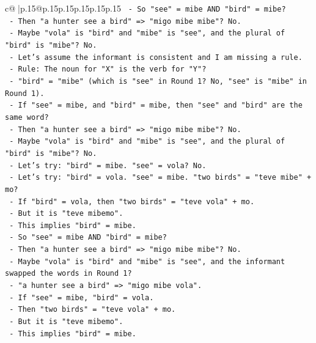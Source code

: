 \documentclass{article}
\begin{document}
{\begin{supertabular}{c@{$\;$}|p{.15\linewidth}@{}p{.15\linewidth}p{.15\linewidth}p{.15\linewidth}p{.15\linewidth}p{.15\linewidth}}
{{{\texttt{          {-} So "see" = mibe AND "bird" = mibe?} \\
\texttt{          {-} Then "a hunter see a bird" => "migo mibe mibe"? No.} \\
\texttt{          {-} Maybe "vola" is "bird" and "mibe" is "see", and the plural of "bird" is "mibe"? No.} \\
\texttt{          {-} Let's assume the informant is consistent and I am missing a rule.} \\
\texttt{          {-} Rule: The noun for "X" is the verb for "Y"?} \\
\texttt{            {-} "bird" = "mibe" (which is "see" in Round 1? No, "see" is "mibe" in Round 1).} \\
\texttt{            {-} If "see" = mibe, and "bird" = mibe, then "see" and "bird" are the same word?} \\
\texttt{            {-} Then "a hunter see a bird" => "migo mibe mibe"? No.} \\
\texttt{            {-} Maybe "vola" is "bird" and "mibe" is "see", and the plural of "bird" is "mibe"? No.} \\
\texttt{            {-} Let's try: "bird" = mibe. "see" = vola? No.} \\
\texttt{            {-} Let's try: "bird" = vola. "see" = mibe. "two birds" = "teve mibe" + mo?} \\
\texttt{            {-} If "bird" = vola, then "two birds" = "teve vola" + mo.} \\
\texttt{            {-} But it is "teve mibemo".} \\
\texttt{            {-} This implies "bird" = mibe.} \\
\texttt{            {-} So "see" = mibe AND "bird" = mibe?} \\
\texttt{            {-} Then "a hunter see a bird" => "migo mibe mibe"? No.} \\
\texttt{            {-} Maybe "vola" is "bird" and "mibe" is "see", and the informant swapped the words in Round 1?} \\
\texttt{            {-} "a hunter see a bird" => "migo mibe vola".} \\
\texttt{            {-} If "see" = mibe, "bird" = vola.} \\
\texttt{            {-} Then "two birds" = "teve vola" + mo.} \\
\texttt{            {-} But it is "teve mibemo".} \\
\texttt{            {-} This implies "bird" = mibe.} \\
}}}
\end{supertabular}}
\end{document}
